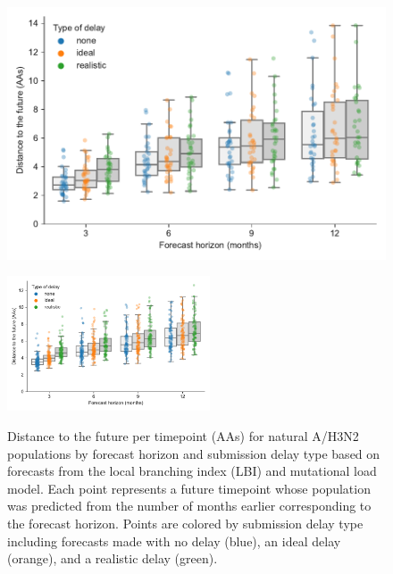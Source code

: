 \documentclass[9pt,lineno]{elife}
\begin{document}
\begin{figure}[htb]
\includegraphics[width=\linewidth]{figures/h3n2_distances_to_the_future_by_delay_and_horizon}
\caption{Distance to the future per timepoint (AAs) for natural A/H3N2 populations by forecast horizon and submission delay type based on forecasts from the local branching index (LBI) and mutational load model.
  Each point represents a future timepoint whose population was predicted from the number of months earlier corresponding to the forecast horizon.
  Points are colored by submission delay type including forecasts made with no delay (blue), an ideal delay (orange), and a realistic delay (green).}
\label{fig:h3n2_distances_to_the_future}
%
{\includegraphics[width=6cm]{figures/simulated_distances_to_the_future_by_delay_and_horizon}}\label{figsupp:simulated_distances_to_the_future}
%
\label{figdata:h3n2_distances_to_the_future}
\label{figsrccode:distances_to_the_future}
\end{figure}
\end{document}
